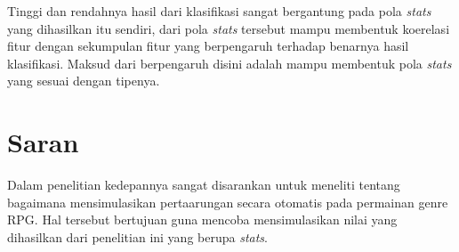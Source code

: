 Tinggi dan rendahnya hasil dari klasifikasi sangat bergantung pada pola \textit{stats} yang dihasilkan itu sendiri, dari pola \textit{stats} tersebut mampu membentuk koerelasi fitur dengan sekumpulan fitur yang berpengaruh terhadap benarnya hasil klasifikasi. Maksud dari berpengaruh disini adalah mampu membentuk pola \textit{stats} yang sesuai dengan tipenya.   
\vspace{1ex}

\section{Saran}
\label{sec:sec4_saran}
\vspace{1ex}

Dalam penelitian kedepannya sangat disarankan untuk meneliti tentang bagaimana mensimulasikan pertaarungan secara otomatis pada permainan genre RPG. Hal tersebut bertujuan guna mencoba mensimulasikan nilai yang dihasilkan dari penelitian ini yang berupa \textit{stats}.